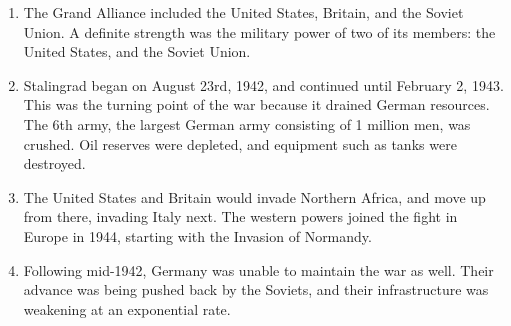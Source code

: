 \documentclass[12pt]{article}
\begin{document}
\begin{flushleft}
\begin{enumerate}
\item The Grand Alliance included the United States, Britain, and the Soviet Union. A definite strength was the military power of two of its members: the United States, and the Soviet Union.

\item Stalingrad began on August 23rd, 1942, and continued until February 2, 1943. This was the turning point of the war because it drained German resources. The 6th army, the largest German army consisting of 1 million men, was crushed. Oil reserves were depleted, and equipment such as tanks were destroyed.

\item The United States and Britain would invade Northern Africa, and move up from there, invading Italy next. The western powers joined the fight in Europe in 1944, starting with the Invasion of Normandy.

\item Following mid-1942, Germany was unable to maintain the war as well. Their advance was being pushed back by the Soviets, and their infrastructure was weakening at an exponential rate.

\end{enumerate}
\end{flushleft}
\end{document}

